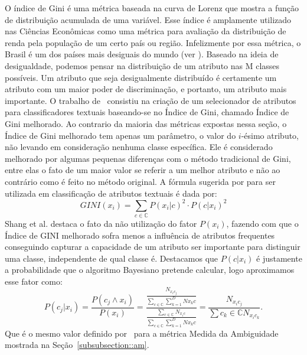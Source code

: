 O índice de Gini é uma métrica baseada na curva de Lorenz que mostra a função de distribuição acumulada de uma variável. Esse índice é amplamente utilizado nas Ciências Econômicas como uma métrica para avaliação da distribuição de renda pela população de um certo país ou região. Infelizmente por essa métrica, o Brasil é um dos países mais desiguais do mundo (ver \cite{cia-gini}). 
Baseado na ideia de desigualdade, podemos pensar na distribuição de um atributo nas M classes possíveis. Um atributo que seja desigualmente distribuído é certamente um atributo com um maior poder de discriminação, e portanto, um atributo mais importante. O trabalho de~\cite{Shang07} consistiu na criação de um selecionador de atributos para classificadores textuais baseando-se no Índice de Gini, chamado Índice de Gini melhorado. Ao contrario da maioria das métricas expostas nessa seção, o Índice de Gini melhorado tem apenas um parâmetro, o valor do $i$-ésimo atributo, não levando em consideração nenhuma classe específica. Ele é considerado melhorado por algumas pequenas diferenças com o método tradicional de Gini, entre elas o fato de um maior valor se referir a um melhor atributo e não ao contrário como é feito no método original. A fórmula sugerida por \cite{Shang07} para ser utilizada em classificação de atributos textuais é dada por:
\begin{equation}\label{eqn::gini}
   GINI(x_i) = \sum_{c \in \mathbb{C}} P(x_i|c)^2 \cdot P(c|x_i)^2
\end{equation}
Shang et al. destaca o fato da não utilização do fator $P(x_i)$, fazendo com que o Índice de GINI melhorado sofra menos a influência de atributos frequentes conseguindo capturar a capacidade de um atributo ser importante para distinguir uma classe, independente de qual classe é. Destacamos que $P(c|x_i)$ é justamente a probabilidade que o algoritmo Bayesiano pretende calcular, logo aproximamos esse fator como:
\begin{equation}\label{eqn::gini}
   P(c_j|x_i) = \frac{  P(c_j \wedge x_i) } { P(x_i) } = \frac{ \frac{ N_{x_ic_j}}{  \sum\limits_{c \in \mathbb{C}} \sum\limits_{k=1}^{D} {Nx_kc}  } } { \frac{\sum\limits_{c \in \mathbb{C}} N_{x_ic}}{ \sum\limits_{c \in \mathbb{C}} \sum\limits_{k=1}^{D} {Nx_kc}}} = \frac{ N_{x_{i}c_{j}}}{\sum\limits{c_k \in \mathbb{C}} N_{x_{i}c_{k}}}.
\end{equation}
Que é o mesmo valor definido por~\cite{Mengle08} para a métrica Medida da Ambiguidade mostrada na Seção~\ref{subsubsection::am}.

